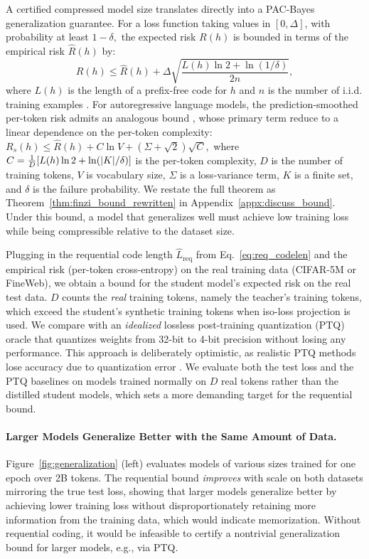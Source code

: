 \documentclass{article}
\theoremstyle{plain}
\theoremstyle{definition}
\theoremstyle{remark}
\begin{document}
A certified compressed model size translates directly into a PAC-Bayes generalization guarantee. For a loss function taking values in $[0,\Delta]$, with probability at least $1-\delta,$ the expected risk $R(h)$ is bounded in terms of the empirical risk $\hat R(h)$ by:
\begin{equation}
    R(h) \le \hat{R}(h) + \Delta\sqrt{\frac{L(h)\ln 2 + \ln(1/\delta)}{2n}},
\end{equation}
where $L(h)$ is the length of a prefix-free code for $h$ and $n$ is the number of i.i.d. training examples \citep{shalev2014understanding,zhou2018non,lotfi2022pac,lotfi2023non}. For autoregressive language models, the prediction-smoothed per-token risk admits an analogous bound \citep{lotfi2024unlocking}, whose primary term \citet{finzi2025compute} reduce to a linear dependence on the per-token complexity: $R_s(h) \le \hat{R}(h) + C\ln V + (\Sigma+\sqrt2)\sqrt{C},$
where $C = \frac{1}{D}\qty[L(h)\ln 2 + \ln(|K|/\delta)]$ is the per-token complexity, $D$ is the number of training tokens, $V$ is vocabulary size, $\Sigma$ is a loss-variance term, $K$ is a finite set, and $\delta$ is the failure probability. We restate the full theorem as Theorem~\ref{thm:finzi_bound_rewritten} in Appendix~\ref{appx:discuss_bound}. Under this bound, a model that generalizes well must achieve low training loss while being compressible relative to the dataset size.  

Plugging in the requential code length $\widehat{L}_{\mathrm{req}}$ from Eq.~\eqref{eq:req_codelen} and the empirical risk (per-token cross-entropy) on the real training data (CIFAR-5M or FineWeb), we obtain a bound for the student model's expected risk on the real test data. $D$ counts the \emph{real} training tokens, namely the teacher's training tokens, which exceed the student's synthetic training tokens when iso-loss projection is used. We compare with an \emph{idealized} lossless post-training quantization (PTQ) oracle that quantizes weights from 32-bit to 4-bit precision without losing any performance. This approach is deliberately optimistic, as realistic PTQ methods lose accuracy due to quantization error \citep{lin2024awq, frantar2023gptq,tseng2024quip}. We evaluate both the test loss and the PTQ baselines on models trained normally on $D$ real tokens rather than the distilled student models, which sets a more demanding target for the requential bound.



\paragraph{Larger Models Generalize Better with the Same Amount of Data.} Figure~\ref{fig:generalization} (left) evaluates models of various sizes trained for one epoch over 2B tokens. The requential bound \emph{improves} with scale on both datasets mirroring the true test loss, showing that larger models generalize better by achieving lower training loss without disproportionately retaining more information from the training data, which would indicate memorization. Without requential coding, it would be infeasible to certify a nontrivial generalization bound for larger models, e.g., via PTQ.
%
\end{document}
